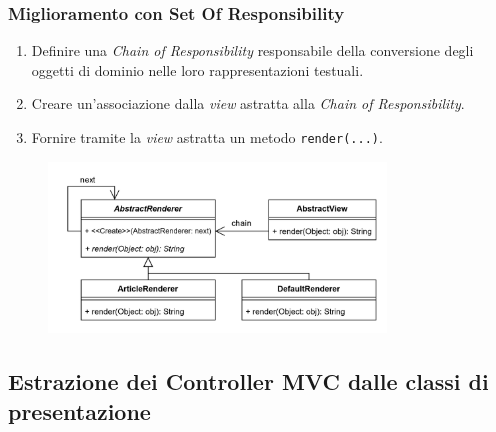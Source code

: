 \begin{frame}[fragile]
    \frametitle{Miglioramento con Set Of Responsibility}
    \begin{enumerate}
        \item Definire una \emph{Chain of Responsibility} responsabile della conversione degli oggetti
        di dominio nelle loro rappresentazioni testuali.
        \item Creare un'associazione dalla \emph{view} astratta alla \emph{Chain of Responsibility}.
        \item Fornire tramite la \emph{view} astratta un metodo \texttt{render(...)}.
    \end{enumerate}

    \begin{figure}
        \includegraphics[width=0.8\textwidth]{img/chain.png}
    \end{figure}
\end{frame}


\subsection{Estrazione dei Controller MVC dalle classi di presentazione}
